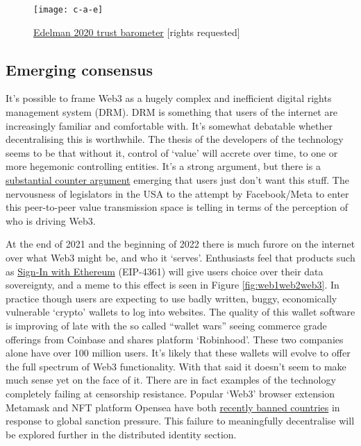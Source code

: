 \begin{figure}
  \centering
    \texttt{[image: c-a-e]}
  \caption{\href{https://www.edelman.com/trust/2020-trust-barometer}{Edelman 2020 trust barometer} [rights requested]}
  \label{fig:trustbarometer}
\end{figure}
\subsection{Emerging consensus}
It's possible to frame Web3 as a hugely complex and inefficient digital rights management system (DRM). DRM is something that users of the internet are increasingly familiar and comfortable with. It's somewhat debatable whether decentralising this is worthwhile. The thesis of the developers of the technology seems to be that without it, control of `value' will accrete over time, to one or more hegemonic controlling entities. It's a strong argument, but there is a \href{https://moxie.org/2022/01/07/web3-first-impressions.html}{substantial counter argument} emerging that users just don't want this stuff. The nervousness of legislators in the USA to the attempt by Facebook/Meta to enter this peer-to-peer value transmission space is telling in terms of the perception of who is driving Web3.\par
At the end of 2021 and the beginning of 2022 there is much furore on the internet over what Web3 might be, and who it `serves'. 
Enthusiasts feel that products such as \href{https://blog.spruceid.com/sign-in-with-ethereum-is-a-game-changer-part-1/}{Sign-In with Ethereum} (EIP-4361) will give users choice over their data sovereignty, and a meme to this effect is seen in Figure \ref{fig:web1web2web3}. In practice though users are expecting to use badly written, buggy, economically vulnerable `crypto' wallets to log into websites. The quality of this wallet software is improving of late with the so called ``wallet wars'' seeing commerce grade offerings from Coinbase and shares platform `Robinhood'. These two companies alone have over 100 million users. It's likely that these wallets will evolve to offer the full spectrum of Web3 functionality. With that said it doesn't seem to make much sense yet on the face of it. There are in fact examples of the technology completely failing at censorship resistance. Popular `Web3' browser extension Metamask and NFT platform Opensea have both \href{https://www.forbes.com/sites/stevenehrlich/2022/03/03/iranian-venezuela-users-abruptly-dropped-from-major-crypto-platforms-as-russian-sanctions-grow/?sh=22bcabc470b0}{recently banned countries} in response to global sanction pressure. This failure to meaningfully decentralise will be explored further in the distributed identity section. \par
